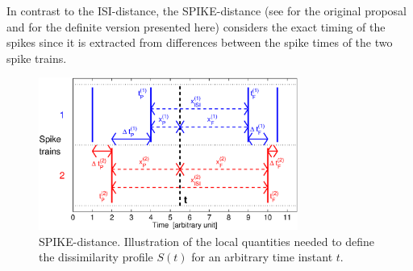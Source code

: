\documentclass[10pt,twocolumn]{elsart5p}
\begin{document}
In contrast to the ISI-distance, the SPIKE-distance (see \citet{Kreuz11} for the original proposal and \citet{Kreuz13} for the definite version presented here) considers the exact timing of the spikes since it is extracted from differences between the spike times of the two spike trains. 
%
%
\begin{figure}
    \includegraphics[width=85mm]{Fig1_SPIKE_Illustration.eps}
    \caption{\abb\label{fig:Fig1-SPIKE-Illustration} SPIKE-distance. Illustration of the local
	    quantities needed to define the dissimilarity profile $S (t)$ for an arbitrary time 
    		instant $t$.}
\end{figure}
%
\end{document}
